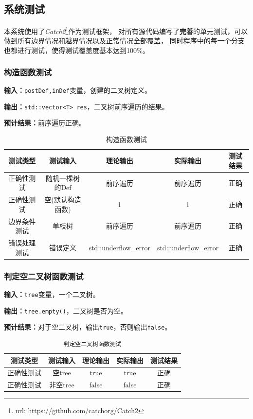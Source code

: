 \subsection{系统测试}
本系统使用了\textit{Catch2}\footnote{url: https://github.com/catchorg/Catch2}作为测试框架，
对所有源代码编写了\textbf{完善}的单元测试，可以做到所有边界情况和越界情况以及正常情况全部覆盖，
同时程序中的每一个分支也都进行测试，使得测试覆盖度基本达到100\%。
\subsubsection{构造函数测试}
\textbf{输入：}\texttt{postDef,inDef}变量，创建的二叉树定义。
\par
\textbf{输出：}\texttt{std::vector<T> res}，二叉树前序遍历的结果。
\par
\textbf{预计结果：}前序遍历正确。
\begin{table}[Htb]
\centering
\caption{构造函数测试}
\begin{tabular}{@{}ccccc@{}}
\toprule
\multicolumn{1}{c}{测试类型}    & \multicolumn{1}{c}{测试输入} & \multicolumn{1}{c}{理论输出} & \multicolumn{1}{c}{实际输出} & \multicolumn{1}{c}{测试结果} \\ \midrule
\multicolumn{1}{c|}{正确性测试}  & 随机一棵树的Def&前序遍历&前序遍历&正确\\
\multicolumn{1}{c|}{正确性测试}  & 空(默认构造函数)&1&1&正确\\
\multicolumn{1}{c|}{边界条件测试}  & 单枝树&前序遍历&前序遍历&正确\\
\multicolumn{1}{c|}{错误处理测试} & 错误定义& std::underflow\_error& std::underflow\_error& 正确\\ \bottomrule
\end{tabular}
\label{tab:inittest3}
\end{table}

\subsubsection{判定空二叉树函数测试}
\textbf{输入：}\texttt{tree}变量，一个二叉树。
\par
\textbf{输出：}\texttt{tree.empty()}，二叉树是否为空。
\par
\textbf{预计结果：}对于空二叉树，输出\texttt{true}，否则输出\texttt{false}。
\begin{table}[Htb]
\centering
    \caption{\texttt{判定空二叉树函数测试}}
\begin{tabular}{@{}ccccc@{}}
\toprule
\multicolumn{1}{c}{测试类型}    & \multicolumn{1}{c}{测试输入} & \multicolumn{1}{c}{理论输出} & \multicolumn{1}{c}{实际输出} & \multicolumn{1}{c}{测试结果} \\ \midrule
\multicolumn{1}{c|}{正确性测试}  & 空tree&true&true&正确\\
\multicolumn{1}{c|}{正确性测试}  & 非空tree&false&false&正确\\ \bottomrule
\end{tabular}
\label{tab:emptytest3}
\end{table}


